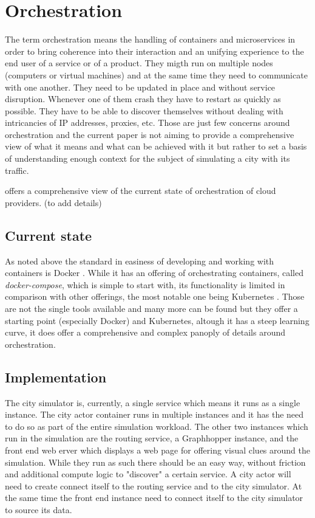 \documentclass[conference]{IEEEtran}
\begin{document}
\section{Orchestration}
\label{sec:orchestration}

The term orchestration means the handling of containers and microservices in order to bring coherence into their interaction and an unifying experience to the end user of a service or of a product. They migth run on multiple nodes (computers or virtual machines) and at the same time they need to communicate with one another. They need to be updated in place and without service disruption. Whenever one of them crash they have to restart as quickly as possible. They have to be able to discover themselves without dealing with intricancies of IP addresses, proxies, etc. Those are just few concerns around orchestration and the current paper is not aiming to provide a comprehensive view of what it means and what can be achieved with it but rather to set a basis of understanding enough context for the subject of simulating a city with its traffic.

\cite{7922500} offers a comprehensive view of the current state of orchestration of cloud providers. (to add details)

\subsection{Current state}

As noted above the standard in easiness of developing and working with containers is Docker \citep{docker}. While it has an offering of orchestrating containers, called \textit{docker-compose}, which is simple to start with, its functionality is limited in comparison with other offerings, the most notable one being Kubernetes \citep{Kubernetes}. Those are not the single tools available and many more can be found but they offer a starting point (especially Docker) and Kubernetes, altough it has a steep learning curve, it does offer a comprehensive and complex panoply of details around orchestration.


\subsection{Implementation}

The city simulator is, currently, a single service which means it runs as a single instance. The city actor container runs in multiple instances and it has the need to do so as part of the entire simulation workload. The other two instances which run in the simulation are the routing service, a Graphhopper instance, and the front end web erver which displays a web page for offering visual clues around the simulation. While they run as such there should be an easy way, without friction and additional compute logic to "discover" a certain service. A city actor will need to create connect itself to the routing service and to the city simulator. At the same time the front end instance need to connect itself to the city simulator to source its data.
\end{document}
